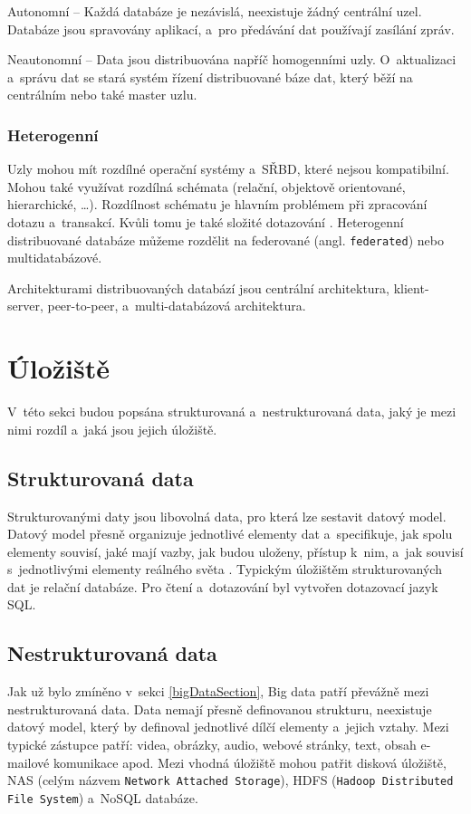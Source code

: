 \vspace{0.5cm}
\noindent Autonomní -- Každá databáze je nezávislá, neexistuje žádný centrální uzel. Databáze jsou spravovány aplikací, a~pro předávání dat používají zasílání zpráv.

\vspace{0.5cm}
\noindent Neautonomní -- Data jsou distribuována napříč homogenními uzly. O~aktualizaci a~správu dat se stará systém řízení distribuované báze dat, který běží na centrálním nebo také master uzlu.

\subsubsection{Heterogenní}
Uzly mohou mít rozdílné operační systémy a~SŘBD, které nejsou kompatibilní. Mohou také využívat rozdílná schémata (relační, objektově orientované, hierarchické, \ldots). Rozdílnost schématu je hlavním problémem při zpracování dotazu a~transakcí. Kvůli tomu je také složité dotazování \cite{wikiDBMS}. Heterogenní distribuované databáze můžeme rozdělit na federované (angl. \texttt{federated}) nebo multidatabázové.

\vspace{0.5cm}
\noindent Architekturami distribuovaných databází jsou centrální architektura, klient-server, peer-to-peer, a~multi-databázová architektura.

\section{Úložiště} \label{storage}
V~této sekci budou popsána strukturovaná a~nestrukturovaná data, jaký je mezi nimi rozdíl a~jaká jsou jejich úložiště.

\subsection{Strukturovaná data}
Strukturovanými daty jsou libovolná data, pro která lze sestavit datový model. Datový model přesně organizuje jednotlivé elementy dat a~specifikuje, jak spolu elementy souvisí, jaké mají vazby, jak budou uloženy, přístup k~nim, a~jak souvisí s~jednotlivými elementy reálného světa \cite{structData}. Typickým úložištěm strukturovaných dat je relační databáze. Pro čtení a~dotazování byl vytvořen dotazovací jazyk SQL.

\subsection{Nestrukturovaná data}
Jak už bylo zmíněno v~sekci \ref{bigDataSection}, Big data patří převážně mezi nestrukturovaná data. Data nemají přesně definovanou strukturu, neexistuje datový model, který by definoval jednotlivé dílčí elementy a~jejich vztahy. Mezi typické zástupce patří: videa, obrázky, audio, webové stránky, text, obsah e-mailové komunikace apod. Mezi vhodná úložiště mohou patřit disková úložiště, NAS (celým názvem \texttt{Network Attached Storage}), HDFS (\texttt{Hadoop Distributed File System}) a~NoSQL databáze.

